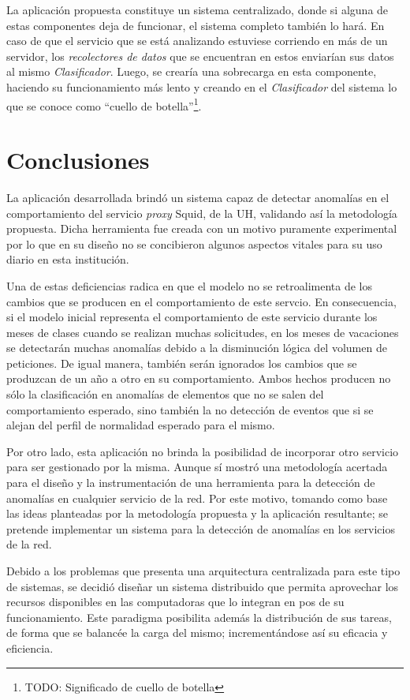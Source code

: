 La aplicación propuesta constituye un sistema centralizado, donde si alguna de
estas componentes deja de funcionar, el sistema completo también lo hará. En
caso de que el servicio que se está analizando estuviese corriendo en más de un
servidor, los \emph{recolectores de datos} que se encuentran en estos enviarían
sus datos al mismo \emph{Clasificador}. Luego, se crearía una sobrecarga en esta
componente, haciendo su funcionamiento más lento y creando en el
\emph{Clasificador} del sistema lo que se conoce como ``cuello de
botella''\footnote{TODO: Significado de cuello de botella}.

\section{Conclusiones}
La aplicación desarrollada brindó un sistema capaz de detectar anomalías en el
comportamiento del servicio \textit{proxy} Squid, de la UH, validando así la
metodología propuesta. Dicha herramienta fue creada con un motivo puramente
experimental por lo que en su diseño no se concibieron algunos aspectos vitales
para su uso diario en esta institución. 

Una de estas deficiencias radica en que el modelo no se retroalimenta de los
cambios que se producen en el comportamiento de este servcio. En consecuencia,
si el modelo inicial representa el comportamiento de este servicio durante los
meses de clases cuando se realizan muchas solicitudes, en los meses de
vacaciones se detectarán muchas anomalías debido a la disminución lógica del
volumen de peticiones. De igual manera, también serán ignorados los cambios que
se produzcan de un año a otro en su comportamiento. Ambos hechos producen no
sólo la clasificación en anomalías de elementos que no se salen del
comportamiento esperado, sino también la no detección de eventos que si se
alejan del perfil de normalidad esperado para el mismo. 

Por otro lado, esta aplicación no brinda la posibilidad de incorporar otro
servicio para ser gestionado por la misma. Aunque sí mostró una metodología
acertada para el diseño y la instrumentación de una herramienta para la
detección de anomalías en cualquier servicio de la red. Por este motivo, tomando
como base las ideas planteadas por la metodología propuesta y la aplicación
resultante; se pretende implementar un sistema para la detección de anomalías en
los servicios de la red. 

Debido a los problemas que presenta una arquitectura centralizada para este tipo
de sistemas, se decidió diseñar un sistema distribuido que permita aprovechar
los recursos disponibles en las computadoras que lo integran en pos de su
funcionamiento. Este paradigma posibilita además la distribución de sus tareas,
de forma que se balancée la carga del mismo; incrementándose así su eficacia y
eficiencia.

